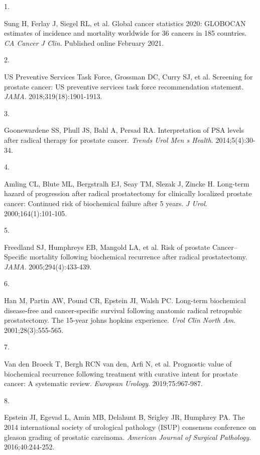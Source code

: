 \documentclass[
  12pt,
  a5,margin=2cmpaper,
]{article}
\newlength{\cslhangindent}
\newlength{\csllabelwidth}
\newlength{\cslentryspacingunit} %
\newenvironment{CSLReferences}[2] %
 {%
  \setlength{\parindent}{0pt}
  \ifodd #1
  \let\oldpar\par
  \def\par{\hangindent=\cslhangindent\oldpar}
  \fi
  \setlength{\parskip}{#2\cslentryspacingunit}
 }%
 {}
\newcommand{\CSLLeftMargin}[1]{\parbox[t]{\csllabelwidth}{#1}}
\newcommand{\CSLRightInline}[1]{\parbox[t]{\linewidth - \csllabelwidth}{#1}\break}
\begin{document}
\hypertarget{refs}{}
\begin{CSLReferences}{0}{0}
\leavevmode{}%
\CSLLeftMargin{1. }%
\CSLRightInline{Sung H, Ferlay J, Siegel RL, et al. Global cancer
statistics 2020: {GLOBOCAN} estimates of incidence and mortality
worldwide for 36 cancers in 185 countries. \emph{CA Cancer J Clin}.
Published online February 2021.}

\leavevmode{}%
\CSLLeftMargin{2. }%
\CSLRightInline{US Preventive Services Task Force, Grossman DC, Curry
SJ, et al. Screening for prostate cancer: {US} preventive services task
force recommendation statement. \emph{JAMA}. 2018;319(18):1901-1913.}

\leavevmode{}%
\CSLLeftMargin{3. }%
\CSLRightInline{Goonewardene SS, Phull JS, Bahl A, Persad RA.
Interpretation of {PSA} levels after radical therapy for prostate
cancer. \emph{Trends Urol Men s Health}. 2014;5(4):30-34.}

\leavevmode{}%
\CSLLeftMargin{4. }%
\CSLRightInline{Amling CL, Blute ML, Bergstralh EJ, Seay TM, Slezak J,
Zincke H. Long-term hazard of progression after radical prostatectomy
for clinically localized prostate cancer: Continued risk of biochemical
failure after 5 years. \emph{J Urol}. 2000;164(1):101-105.}

\leavevmode{}%
\CSLLeftMargin{5. }%
\CSLRightInline{Freedland SJ, Humphreys EB, Mangold LA, et al. Risk of
prostate {Cancer--Specific} mortality following biochemical recurrence
after radical prostatectomy. \emph{JAMA}. 2005;294(4):433-439.}

\leavevmode{}%
\CSLLeftMargin{6. }%
\CSLRightInline{Han M, Partin AW, Pound CR, Epstein JI, Walsh PC.
Long-term biochemical disease-free and cancer-specific survival
following anatomic radical retropubic prostatectomy. The 15-year johns
hopkins experience. \emph{Urol Clin North Am}. 2001;28(3):555-565.}

\leavevmode{}%
\CSLLeftMargin{7. }%
\CSLRightInline{Van den Broeck T, Bergh RCN van den, Arfi N, et al.
Prognostic value of biochemical recurrence following treatment with
curative intent for prostate cancer: A systematic review. \emph{European
Urology}. 2019;75:967-987.}

\leavevmode{}%
\CSLLeftMargin{8. }%
\CSLRightInline{Epstein JI, Egevad L, Amin MB, Delahunt B, Srigley JR,
Humphrey PA. The 2014 international society of urological pathology
({ISUP}) consensus conference on gleason grading of prostatic carcinoma.
\emph{American Journal of Surgical Pathology}. 2016;40:244-252.}


\end{CSLReferences}
\end{document}
